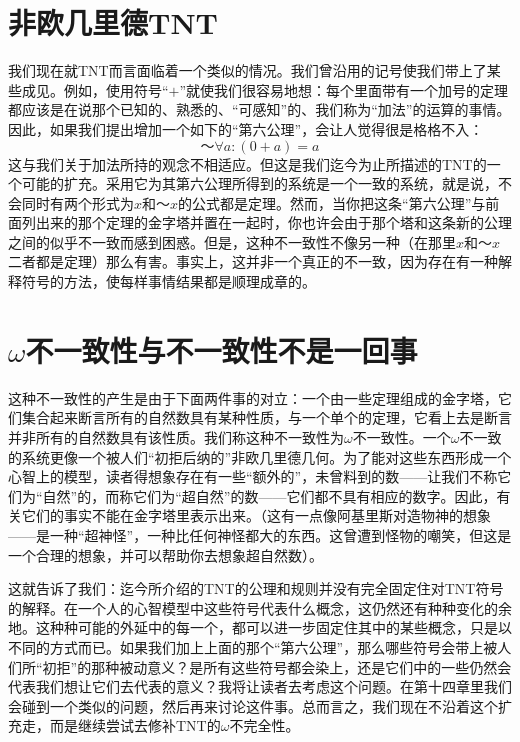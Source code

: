 \section{非欧几里德TNT}

我们现在就TNT而言面临着一个类似的情况。我们曾沿用的记号使我们带上了某些成见。例如，使用符号“$+$”就使我们很容易地想：每个里面带有一个加号的定理都应该是在说那个已知的、熟悉的、“可感知”的、我们称为“加法”的运算的事情。因此，如果我们提出增加一个如下的“第六公理”，会让人觉得很是格格不入：
\[
～\forall a:(0+a)=a
\]
这与我们关于加法所持的观念不相适应。但这是我们迄今为止所描述的TNT的一个可能的扩充。采用它为其第六公理所得到的系统是一个一致的系统，就是说，不会同时有两个形式为$x$和$～x$的公式都是定理。然而，当你把这条“第六公理”与前面列出来的那个定理的金字塔并置在一起时，你也许会由于那个塔和这条新的公理之间的似乎不一致而感到困惑。但是，这种不一致性不像另一种（在那里$x$和$～x$二者都是定理）那么有害。事实上，这并非一个真正的不一致，因为存在有一种解释符号的方法，使每样事情结果都是顺理成章的。

\section{\texorpdfstring{$\omega$}{\textomega}不一致性与不一致性不是一回事}

这种不一致性的产生是由于下面两件事的对立：一个由一些定理组成的金字塔，它们集合起来断言所有的自然数具有某种性质，与一个单个的定理，它看上去是断言并非所有的自然数具有该性质。我们称这种不一致性为$\omega$不一致性。一个$\omega$不一致的系统更像一个被人们“初拒后纳的”非欧几里德几何。为了能对这些东西形成一个心智上的模型，读者得想象存在有一些“额外的”，未曾料到的数——让我们不称它们为“自然”的，而称它们为“超自然”的数——它们都不具有相应的数字。因此，有关它们的事实不能在金字塔里表示出来。（这有一点像阿基里斯对造物神的想象——是一种“超神怪”，一种比任何神怪都大的东西。这曾遭到怪物的嘲笑，但这是一个合理的想象，并可以帮助你去想象超自然数）。

这就告诉了我们：迄今所介绍的TNT的公理和规则并没有完全固定住对TNT符号的解释。在一个人的心智模型中这些符号代表什么概念，这仍然还有种种变化的余地。这种种可能的外延中的每一个，都可以进一步固定住其中的某些概念，只是以不同的方式而已。如果我们加上上面的那个“第六公理”，那么哪些符号会带上被人们所“初拒”的那种被动意义？是所有这些符号都会染上，还是它们中的一些仍然会代表我们想让它们去代表的意义？我将让读者去考虑这个问题。在第十四章里我们会碰到一个类似的问题，然后再来讨论这件事。总而言之，我们现在不沿着这个扩充走，而是继续尝试去修补TNT的$\omega$不完全性。

